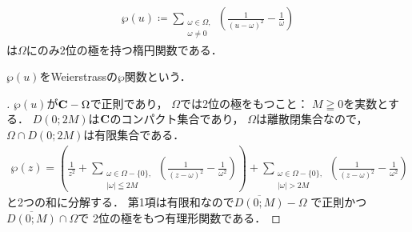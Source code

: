 \begin{Theorem}
    \begin{align}
        \wp(u)\coloneqq 
        \sum_{\substack{\omega\in\Omega,\\\omega\ne 0}}
        \left(\frac{1}{(u-\omega)^2}-\frac{1}{\omega}\right)
    \end{align}
    は$\Omega$にのみ2位の極を持つ楕円関数である．
\end{Theorem}$\wp(u)$をWeierstrassの$\wp$関数という．
\begin{proof}[\pfb]
    $\wp(u)$が$\mathbf{C}-\Omega$で正則であり，
    $\Omega$では2位の極をもつこと：
    $M\geqq0$を実数とする．
    $D(0;2M)$は$\mathbf{C}$のコンパクト集合であり，
    $\Omega$は離散閉集合なので，
    $\Omega\cap D(0;2M)$は有限集合である．
    \begin{align*}
        \wp(z)
        =\left(
            \frac{1}{z^2}
            +\sum_{
                \substack{\omega\in\Omega-\{0\},\\|\omega|\leqq2M}
            }
            \left(
                \frac{1}{(z-\omega)^2}-\frac{1}{\omega^2}
            \right)
        \right)
        +\sum_{
            \substack{\omega\in\Omega-\{0\},\\|\omega|>2M}
        }\left(
            \frac{1}{(z-\omega)^2}-\frac{1}{\omega^2}
        \right)
    \end{align*}
    と2つの和に分解する．
    第1項は有限和なので$\overline{D(0;M)}-\Omega$
    で正則かつ$\overline{D(0;M)}\cap\Omega$で
    2位の極をもつ有理形関数である．


\end{proof}
